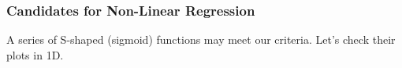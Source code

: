 \documentclass[10pt,aspectratio=169]{beamer}
\begin{document}
\begin{frame}
  \frametitle{Candidates for Non-Linear Regression}

  A series of S-shaped (sigmoid) functions may meet our
  criteria. Let's check their plots in 1D.  \vfill
  \begin{figure}[t]
  \end{figure}
\end{frame}
\end{document}
